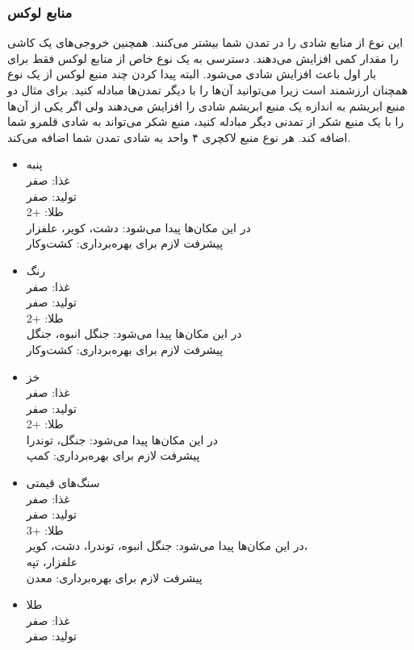 \documentclass[]{article}
\begin{document}
\subsubsection*{{\titr منابع لوکس}}
این نوع از منابع شادی را در تمدن شما بیشتر می‌کنند. همچنین خروجی‌های یک کاشی را مقدار کمی افزایش می‌دهند. دسترسی به یک نوع خاص از منابع لوکس فقط برای بار اول باعث افزایش شادی می‌شود. البته پیدا کردن چند منبع لوکس از یک نوع همچنان ارزشمند است زیرا می‌توانید آن‌ها را با دیگر تمدن‌ها مبادله کنید. برای مثال دو منبع ابریشم به اندازه یک منبع ابریشم شادی را افزایش می‌دهند ولی اگر یکی از آن‌ها را با یک منبع شکر از تمدنی دیگر مبادله کنید، منبع شکر می‌تواند به شادی قلمرو شما اضافه کند. هر نوع منبع لاکچری ۴ واحد به شادی تمدن شما اضافه می‌کند.
\newpage
\begin{itemize}
\item پنبه\\
غذا: صفر\\
تولید‌: صفر\\
طلا: +2\\
در این مکان‌ها پیدا می‌شود: دشت، کویر، علفزار\\
پیشرفت لازم برای بهره‌برداری: کشت‌وکار
\item رنگ\\
غذا: صفر\\
تولید‌: صفر\\
طلا: +2\\
در این مکان‌ها پیدا می‌شود: جنگل انبوه، جنگل\\
پیشرفت لازم برای بهره‌برداری: کشت‌وکار
\item خز\\
غذا: صفر\\
تولید‌: صفر\\
طلا: +2\\
در این مکان‌ها پیدا می‌شود: جنگل، توندرا\\
پیشرفت لازم برای بهره‌برداری: کمپ
\item سنگ‌های قیمتی\\
غذا: صفر\\
تولید‌: صفر\\
طلا: +3\\
در این مکان‌ها پیدا می‌شود: جنگل انبوه،  توندرا، دشت، کویر،\\ علفزار، تپه\\
پیشرفت لازم برای بهره‌برداری: معدن
\item طلا\\
غذا: صفر\\
تولید‌: صفر\\

\end{itemize}
\end{document}
